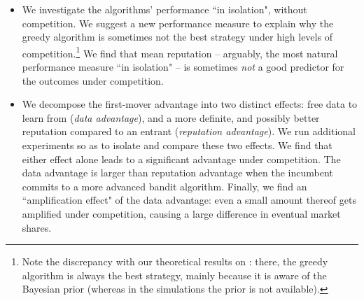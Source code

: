 \begin{itemize}
\item We investigate the algorithms' performance ``in isolation", \ie without competition. We suggest a new performance measure to explain why the greedy algorithm is sometimes not the best strategy under high levels of competition.\footnote{Note the discrepancy with our theoretical results on \HardMax: there, the greedy algorithm is always the best strategy, mainly because it is aware of the Bayesian prior (whereas in the simulations the prior is not available).}
     We find that mean reputation -- arguably, the most natural performance measure ``in isolation" -- is sometimes \emph{not} a good predictor for the outcomes under competition.

\item We decompose the first-mover advantage into two distinct effects: free data to learn from (\emph{data advantage}), and a more definite, and possibly better reputation compared to an entrant (\emph{reputation advantage}). We run additional experiments so as to isolate and compare these two effects. We find that either effect alone leads to a significant advantage under competition. The data advantage is larger than reputation advantage when the incumbent commits to a more advanced bandit algorithm. Finally, we find an ``amplification effect" of the data advantage: even a small amount thereof gets amplified under competition, causing a large difference in eventual market shares.

\end{itemize}



